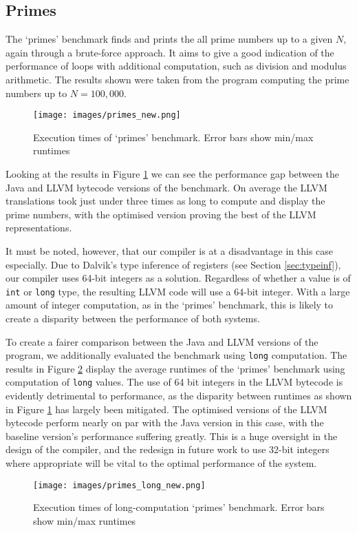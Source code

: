 \subsection*{Primes}

The `primes' benchmark finds and prints the all prime numbers up to a given $N$, again through a brute-force approach. It aims to give a good indication of the performance of loops with additional computation, such as division and modulus arithmetic. The results shown were taken from the program computing the prime numbers up to $N = 100,000$.

\begin{figure}[h!]
    \centering
    \texttt{[image: images/primes\_new.png]}
    \caption[Execution times of `primes' benchmark]{Execution times of `primes' benchmark. Error bars show min/max runtimes}
    \label{fig:res_primes}
\end{figure}

Looking at the results in Figure \ref{fig:res_primes} we can see the performance gap between the Java and LLVM bytecode versions of the benchmark. On average the LLVM translations took just under three times as long to compute and display the prime numbers, with the optimised version proving the best of the LLVM representations.

It must be noted, however, that our compiler is at a disadvantage in this case especially. Due to Dalvik's type inference of registers (see Section \ref{sec:typeinf}), our compiler uses 64-bit integers as a solution. Regardless of whether a value is of \verb|int| or \verb|long| type, the resulting LLVM code will use a 64-bit integer. With a large amount of integer computation, as in the `primes' benchmark, this is likely to create a disparity between the performance of both systems.

To create a fairer comparison between the Java and LLVM versions of the program, we additionally evaluated the benchmark using \verb|long| computation. The results in Figure \ref{fig:res_primes_long} display the average runtimes of the `primes' benchmark using computation of \verb|long| values. The use of 64 bit integers in the LLVM bytecode is evidently detrimental to performance, as the disparity between runtimes as shown in Figure \ref{fig:res_primes} has largely been mitigated. The optimised versions of the LLVM bytecode perform nearly on par with the Java version in this case, with the baseline version's performance suffering greatly. This is a huge oversight in the design of the compiler, and the redesign in future work to use 32-bit integers where appropriate will be vital to the optimal performance of the system.

\begin{figure}[h!]
    \centering
    \texttt{[image: images/primes\_long\_new.png]}
    \caption[Execution times of long-computation `primes' benchmark]{Execution times of long-computation `primes' benchmark. Error bars show min/max runtimes}
    \label{fig:res_primes_long}
\end{figure}
